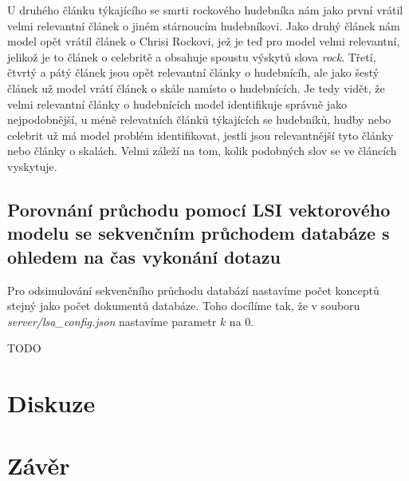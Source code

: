\documentclass[11pt]{scrartcl} %
\begin{document}
\bigskip

U druhého článku týkajícího se smrti rockového hudebníka nám jako první vrátil velmi relevantní článek o jiném stárnoucím hudebníkovi. Jako druhý článek nám model opět vrátil článek o Chrisi Rockovi, jež je teď pro model velmi relevantní, jelikož je to článek o celebritě a obsahuje spoustu výskytů slova \emph{rock}. Třetí, čtvrtý a pátý článek jsou opět relevantní články o hudebnícíh, ale jako šestý článek už model vrátí článek o skále namísto o hudebnících. Je tedy vidět, že velmi relevantní články o hudebnících model identifikuje správně jako nejpodobnější, u méně relevatních článků týkajících se hudebníků, hudby nebo celebrit už má model problém identifikovat, jestli jsou relevantnější tyto články nebo články o skalách. Velmi záleží na tom, kolik podobných slov se ve článcích vyskytuje.

\subsection{Porovnání průchodu pomocí LSI vektorového modelu se sekvenčním průchodem databáze s ohledem na čas vykonání dotazu}

Pro odsimulování sekvenčního průchodu databází nastavíme počet konceptů stejný jako počet dokumentů databáze. Toho docílíme tak, že v souboru \emph{server/lsa\_config.json} nastavíme parametr $k$ na 0.

TODO

\section{Diskuze}


\section{Závěr}
\end{document}
